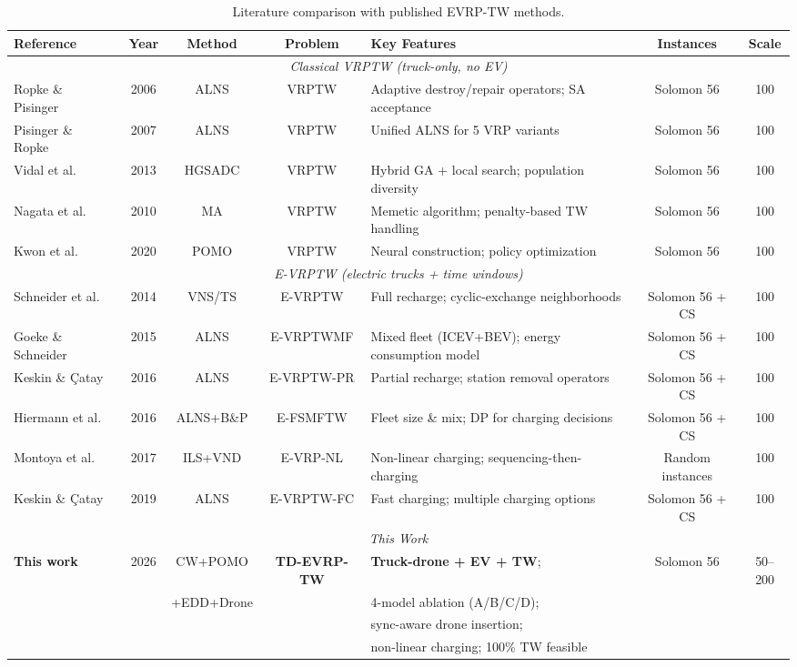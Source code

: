 \begin{table}[t]
\caption{Literature comparison with published EVRP-TW methods.}
\label{tab:lit_evrp}
\small
\centering
\begin{tabular}{l c c c p{3.5cm} c c}
\toprule
\textbf{Reference} & \textbf{Year} & \textbf{Method} & \textbf{Problem} & \textbf{Key Features} & \textbf{Instances} & \textbf{Scale} \\
\midrule
\multicolumn{7}{c}{\textit{Classical VRPTW (truck-only, no EV)}} \\
\midrule
Ropke \& Pisinger~\cite{ropke2006alns} & 2006 & ALNS & VRPTW & Adaptive destroy/repair operators; SA acceptance & Solomon 56 & 100 \\
Pisinger \& Ropke~\cite{pisinger2007alns} & 2007 & ALNS & VRPTW & Unified ALNS for 5 VRP variants & Solomon 56 & 100 \\
Vidal et al.~\cite{vidal2013hybrid} & 2013 & HGSADC & VRPTW & Hybrid GA + local search; population diversity & Solomon 56 & 100 \\
Nagata et al.~\cite{nagata2010penalty} & 2010 & MA & VRPTW & Memetic algorithm; penalty-based TW handling & Solomon 56 & 100 \\
Kwon et al.~\cite{kwon2020pomo} & 2020 & POMO & VRPTW & Neural construction; policy optimization & Solomon 56 & 100 \\
\midrule
\multicolumn{7}{c}{\textit{E-VRPTW (electric trucks + time windows)}} \\
\midrule
Schneider et al.~\cite{schneider2014evrp} & 2014 & VNS/TS & E-VRPTW & Full recharge; cyclic-exchange neighborhoods & Solomon 56 + CS & 100 \\
Goeke \& Schneider~\cite{goeke2015evrptwmf} & 2015 & ALNS & E-VRPTWMF & Mixed fleet (ICEV+BEV); energy consumption model & Solomon 56 + CS & 100 \\
Keskin \& \c{C}atay~\cite{keskin2016partial} & 2016 & ALNS & E-VRPTW-PR & Partial recharge; station removal operators & Solomon 56 + CS & 100 \\
Hiermann et al.~\cite{hiermann2016efsmftw} & 2016 & ALNS+B\&P & E-FSMFTW & Fleet size \& mix; DP for charging decisions & Solomon 56 + CS & 100 \\
Montoya et al.~\cite{montoya2017nonlinear} & 2017 & ILS+VND & E-VRP-NL & Non-linear charging; sequencing-then-charging & Random instances & 100 \\
Keskin \& \c{C}atay~\cite{keskin2019fast} & 2019 & ALNS & E-VRPTW-FC & Fast charging; multiple charging options & Solomon 56 + CS & 100 \\
\midrule
\multicolumn{7}{c}{\textit{This Work}} \\
\midrule
\textbf{This work} & 2026 & CW+POMO & \textbf{TD-EVRP-TW} & \textbf{Truck-drone + EV + TW}; & Solomon 56 & 50--200 \\
 & & +EDD+Drone & & 4-model ablation (A/B/C/D); & & \\
 & & & & sync-aware drone insertion; & & \\
 & & & & non-linear charging; 100\% TW feasible & & \\
\bottomrule
\end{tabular}


\end{table}
